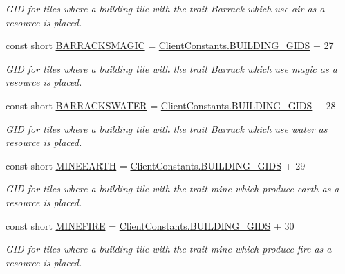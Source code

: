 \begin{DoxyCompactItemize}
\begin{DoxyCompactList}\small\item\em G\+I\+D for tiles where a building tile with the trait Barrack which use air as a resource is placed. \end{DoxyCompactList}\item 
const short \hyperlink{classClient_1_1Common_1_1Constants_1_1BuildingGid_ac1ba3a14f7b780dd84ab94ad0db5252d}{B\+A\+R\+R\+A\+C\+K\+S\+M\+A\+G\+I\+C} = \hyperlink{classClient_1_1Common_1_1Constants_1_1ClientConstants_ad2e944ac733f952d3d0c2e24fe5d14ad}{Client\+Constants.\+B\+U\+I\+L\+D\+I\+N\+G\+\_\+\+G\+I\+D\+S} + 27
\begin{DoxyCompactList}\small\item\em G\+I\+D for tiles where a building tile with the trait Barrack which use magic as a resource is placed. \end{DoxyCompactList}\item 
const short \hyperlink{classClient_1_1Common_1_1Constants_1_1BuildingGid_a0b4b1c1a3ed14caad9a22c4f1950c8d5}{B\+A\+R\+R\+A\+C\+K\+S\+W\+A\+T\+E\+R} = \hyperlink{classClient_1_1Common_1_1Constants_1_1ClientConstants_ad2e944ac733f952d3d0c2e24fe5d14ad}{Client\+Constants.\+B\+U\+I\+L\+D\+I\+N\+G\+\_\+\+G\+I\+D\+S} + 28
\begin{DoxyCompactList}\small\item\em G\+I\+D for tiles where a building tile with the trait Barrack which use water as resource is placed. \end{DoxyCompactList}\item 
const short \hyperlink{classClient_1_1Common_1_1Constants_1_1BuildingGid_a57aa9dce96f92143d655a10db1ed9176}{M\+I\+N\+E\+E\+A\+R\+T\+H} = \hyperlink{classClient_1_1Common_1_1Constants_1_1ClientConstants_ad2e944ac733f952d3d0c2e24fe5d14ad}{Client\+Constants.\+B\+U\+I\+L\+D\+I\+N\+G\+\_\+\+G\+I\+D\+S} + 29
\begin{DoxyCompactList}\small\item\em G\+I\+D for tiles where a building tile with the trait mine which produce earth as a resource is placed. \end{DoxyCompactList}\item 
const short \hyperlink{classClient_1_1Common_1_1Constants_1_1BuildingGid_a14b7f89faee6a0b0f80269398bae672b}{M\+I\+N\+E\+F\+I\+R\+E} = \hyperlink{classClient_1_1Common_1_1Constants_1_1ClientConstants_ad2e944ac733f952d3d0c2e24fe5d14ad}{Client\+Constants.\+B\+U\+I\+L\+D\+I\+N\+G\+\_\+\+G\+I\+D\+S} + 30
\begin{DoxyCompactList}\small\item\em G\+I\+D for tiles where a building tile with the trait mine which produce fire as a resource is placed. \end{DoxyCompactList}\item 

\end{DoxyCompactItemize}
